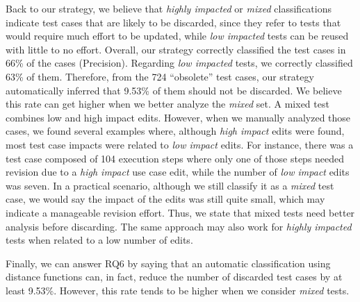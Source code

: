 Back to our strategy, we believe that \textit{highly impacted} or \textit{mixed} classifications indicate test cases that are likely to be discarded, since they refer to tests that would require much effort to be updated, while \textit{low impacted} tests can be reused with little to no effort. Overall, our strategy correctly classified the test cases in 66\% of the cases (Precision). Regarding \textit{low impacted} tests, we correctly classified 63\% of them. Therefore, from the 724 ``obsolete'' test cases, our strategy automatically inferred that 9.53\% of them should not be discarded.
We believe this rate can get higher when we better analyze the \textit{mixed} set. A mixed test combines low and high impact edits. However, when we manually analyzed those cases, we found several examples where, although \textit{high impact} edits were found, most test case impacts were related to \textit{low impact} edits. For instance, there was a test case composed of 104 execution steps where only one of those steps needed revision due to a \textit{high impact} use case edit, while the number of \textit{low impact} edits was seven. In a practical scenario, although we still classify it as a \textit{mixed} test case, we would say the impact of the edits was still quite small, which may indicate a manageable revision effort. Thus, we state that mixed tests need better analysis before discarding. The same approach may also work for \textit{highly impacted} tests when related to a low number of edits.

Finally, we can answer RQ6 by saying that an automatic classification using distance functions can, in fact, reduce the number of discarded test cases by at least 9.53\%. However, this rate tends to be higher when we consider \textit{mixed} tests.
\\
\\
\noindent
\vspace{2mm} %







